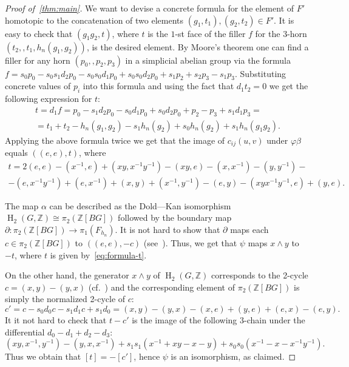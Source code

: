 \documentclass[oneside, 10pt]{amsart}
\theoremstyle{plain}
\numberwithin{equation}{section}
\numberwithin{lemma}{section}
\theoremstyle{remark}
\theoremstyle{definition}
\DeclareMathOperator{\HH}{H}
\newcommand{\ZZ}{\mathbb{Z}}
\begin{document}
\begin{proof}[Proof of~\cref{thm:main}]
We want to devise a concrete formula for the element of $F'$ homotopic to the concatenation of two elements $(g_1, t_1), (g_2, t_2) \in F'$.
It is easy to check that $(g_1g_2, t)$, where $t$ is the $1$-st face of the filler $f$ for the $3$-horn $(t_2, ,t_1, h_n(g_1, g_2))$, is the desired element.
By Moore's theorem one can find a filler for any horn $(p_0, ,p_2, p_3)$ in a simplicial abelian group via the formula
 $f = s_0 p_0 - s_0 s_1 d_2 p_0 - s_0 s_0 d_1 p_0 + s_0 s_0 d_2 p_0 + s_1 p_2 + s_2 p_3 - s_1 p_3$. 
Substituting concrete values of $p_i$ into this formula and using the fact that $d_1t_2=0$ we get the following expression for $t$:
\begin{multline} \nonumber t = d_1f = p_0 - s_1 d_2 p_0 - s_0 d_1 p_0 + s_0 d_2 p_0 + p_2 - p_3 + s_1 d_1 p_3 = \\
             = t_1 + t_2 - h_n(g_1, g_2) - s_1 h_n(g_2) + s_0 h_n(g_2) + s_1 h_n (g_1g_2). \end{multline}
Applying the above formula twice we get that the image of $c_{ij}(u,v)$ under $\varphi\beta$ equals $((e, e), t)$, where
\begin{multline} \label{eq:formula-t} t = 2(e, e)-(x^{-1}, e) +(xy, x^{-1}y^{-1}) -(xy, e) -(x, x^{-1}) -(y, y^{-1}) -\\  -(e, x^{-1}y^{-1}) +(e, x^{-1}) +(x, y) +(x^{-1}, y^{-1}) -(e, y) -(xyx^{-1}y^{-1}, e) +(y, e).\end{multline}

The map $\alpha$ can be described as the Dold---Kan isomorphism $\HH_2(G, \ZZ) \cong \pi_2(\ZZ[BG])$ followed by the boundary map $\partial\colon \pi_2(\ZZ[BG]) \to \pi_1(F_{h_n})$.
It is not hard to show that $\partial$ maps each $c \in \pi_2(\ZZ[BG])$ to $((e,e),-c)$ (see~\cite[p.~29]{GJar09}).
Thus, we get that $\psi$ maps $x \wedge y$ to $-t$, where $t$ is given by~\eqref{eq:formula-t}.

On the other hand, the generator $x \wedge y$ of $\HH_2(G, \ZZ)$ corresponds to the 2-cycle $c = (x, y) - (y, x)$ (cf.~\cite[(14), p.~582]{Mi52}) and the corresponding
element of $\pi_2(\ZZ[BG])$ is simply the normalized 2-cycle of $c$:
\begin{equation} \nonumber c' = c - s_0d_0c - s_1d_1c + s_1d_0 = (x, y) - (y, x) - (x, e) +(y, e) + (e, x) - (e, y). \end{equation}
It it not hard to check that $t-c'$ is the image of the following $3$-chain under the differential $d_0-d_1+d_2-d_3$:
\[(xy, x^{-1}, y^{-1}) - (y, x, x^{-1}) + s_1 s_1(x^{-1} + xy - x - y) + s_0 s_0(x^{-1} - x - x^{-1}y^{-1}).\]
Thus we obtain that $[t] = -[c']$, hence $\psi$ is an isomorphism, as claimed.
\end{proof}
\end{document}
